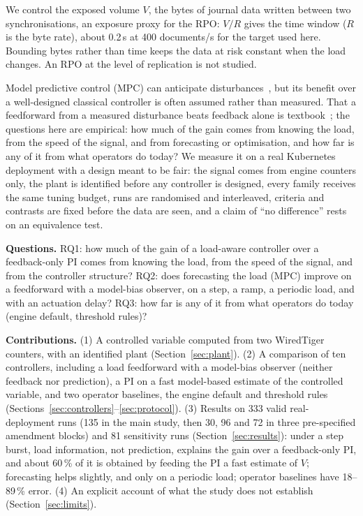 \documentclass[journal]{IEEEtran}
\begin{document}
We control the exposed volume $V$, the bytes of journal data written between two synchronisations, an exposure proxy for the RPO: $V/R$ gives the time window ($R$ is the byte rate), about 0.2\,s at 400 documents/s for the target used here. Bounding bytes rather than time keeps the data at risk constant when the load changes. An RPO at the level of replication is not studied.

Model predictive control (MPC) can anticipate disturbances~\cite{camacho2013model}, but its benefit over a well-designed classical controller is often assumed rather than measured. That a feedforward from a measured disturbance beats feedback alone is textbook~\cite{astrom2008feedback}; the questions here are empirical: how much of the gain comes from knowing the load, from the speed of the signal, and from forecasting or optimisation, and how far is any of it from what operators do today? We measure it on a real Kubernetes deployment with a design meant to be fair: the signal comes from engine counters only, the plant is identified before any controller is designed, every family receives the same tuning budget, runs are randomised and interleaved, criteria and contrasts are fixed before the data are seen, and a claim of ``no difference'' rests on an equivalence test.

\textbf{Questions.} RQ1: how much of the gain of a load-aware controller over a feedback-only PI comes from knowing the load, from the speed of the signal, and from the controller structure? RQ2: does forecasting the load (MPC) improve on a feedforward with a model-bias observer, on a step, a ramp, a periodic load, and with an actuation delay? RQ3: how far is any of it from what operators do today (engine default, threshold rules)?

\textbf{Contributions.} (1) A controlled variable computed from two WiredTiger counters, with an identified plant (Section~\ref{sec:plant}). (2) A comparison of ten controllers, including a load feedforward with a model-bias observer (neither feedback nor prediction), a PI on a fast model-based estimate of the controlled variable, and two operator baselines, the engine default and threshold rules (Sections~\ref{sec:controllers}--\ref{sec:protocol}). (3) Results on 333 valid real-deployment runs (135 in the main study, then 30, 96 and 72 in three pre-specified amendment blocks) and 81 sensitivity runs (Section~\ref{sec:results}): under a step burst, load information, not prediction, explains the gain over a feedback-only PI, and about 60\,\% of it is obtained by feeding the PI a fast estimate of $V$; forecasting helps slightly, and only on a periodic load; operator baselines have 18--89\,\% error. (4) An explicit account of what the study does not establish (Section~\ref{sec:limits}).
\end{document}
